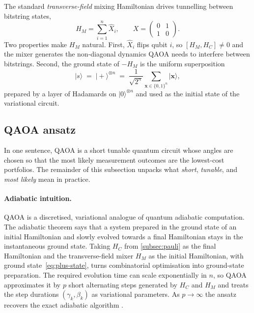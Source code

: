 The standard \emph{transverse-field} mixing Hamiltonian drives tunnelling between bitstring states,
\begin{equation}\label{eq:HM-transverse}
    H_M = \sum_{i=1}^{n} \hat{X}_i,
    \qquad
    X = \begin{pmatrix} 0 & 1 \\ 1 & 0 \end{pmatrix}.
\end{equation}
Two properties make $H_M$ natural. First, $\hat X_i$ flips qubit $i$, so $[H_M, H_C]\neq 0$ and the mixer generates the non-diagonal dynamics QAOA needs to interfere between bitstrings. Second, the ground state of $-H_M$ is the uniform superposition
\begin{equation}\label{eq:plus-state}
    |s\rangle \;=\; |+\rangle^{\otimes n} \;=\; \frac{1}{\sqrt{2^n}}\sum_{\boldsymbol{x}\in\{0,1\}^n} |\boldsymbol{x}\rangle,
\end{equation}
prepared by a layer of Hadamards on $|0\rangle^{\otimes n}$ and used as the initial state of the variational circuit.


\subsection{QAOA ansatz}\label{subsec:qaoa}

In one sentence, QAOA is a short tunable quantum circuit whose angles are chosen so that the most likely measurement outcomes are the lowest-cost portfolios. The remainder of this subsection unpacks what \emph{short}, \emph{tunable}, and \emph{most likely} mean in practice.

\paragraph{Adiabatic intuition.}
QAOA \autocite{farhi2014qaoa} is a discretised, variational analogue of quantum adiabatic computation. The adiabatic theorem says that a system prepared in the ground state of an initial Hamiltonian and slowly evolved towards a final Hamiltonian stays in the instantaneous ground state. Taking $H_C$ from \cref{subsec:pauli} as the final Hamiltonian and the transverse-field mixer $H_M$ as the initial Hamiltonian, with ground state~\eqref{eq:plus-state}, turns combinatorial optimisation into ground-state preparation. The required evolution time can scale exponentially in $n$, so QAOA approximates it by $p$ short alternating steps generated by $H_C$ and $H_M$ and treats the step durations $(\gamma_k, \beta_k)$ as variational parameters. As $p \to \infty$ the ansatz recovers the exact adiabatic algorithm \autocite{zhou2018qaoa}.

